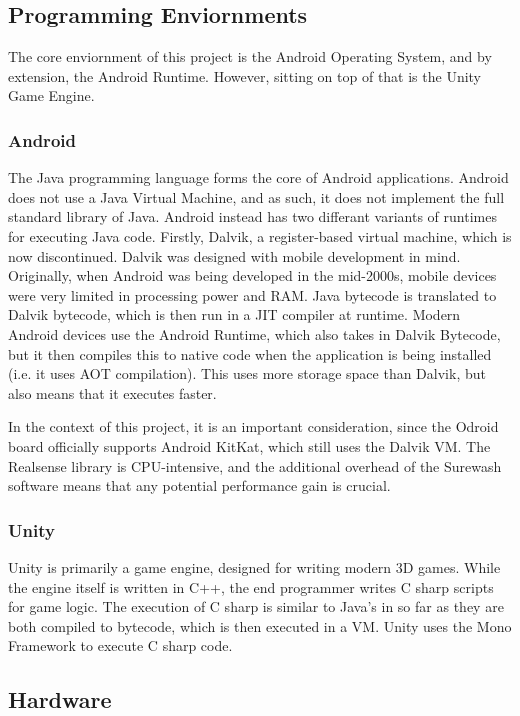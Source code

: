     \subsection{Programming Enviornments}
    The core enviornment of this project is the Android Operating System, and by extension, the Android Runtime. However, sitting on top of that is the Unity Game Engine.
        \subsubsection{Android}
        The Java programming language forms the core of Android applications. Android does not use a Java Virtual Machine, and as such, it does not implement the full standard library of Java. Android instead has two differant variants of runtimes for executing Java code. Firstly, Dalvik, a register-based virtual machine, which is now discontinued. Dalvik was designed with mobile development in mind. Originally, when Android was being developed in the mid-2000s, mobile devices were very limited in processing power and RAM. Java bytecode is translated to Dalvik bytecode, which is then run in a JIT compiler at runtime. Modern Android devices use the Android Runtime, which also takes in Dalvik Bytecode, but it then compiles this to native code when the application is being installed (i.e. it uses AOT compilation). This uses more storage space than Dalvik, but also means that it executes faster.

        In the context of this project, it is an important consideration, since the Odroid board officially supports Android KitKat, which still uses the Dalvik VM. The Realsense library is CPU-intensive, and the additional overhead of the Surewash software means that any potential performance gain is crucial.
        \subsubsection{Unity}
        Unity is primarily a game engine, designed for writing modern 3D games. While the engine itself is written in C++, the end programmer writes C sharp scripts for game logic. The execution of C sharp is similar to Java's in so far as they are both compiled to bytecode, which is then executed in a VM. Unity uses the Mono Framework to execute C sharp code.
    
    \subsection{Hardware}
